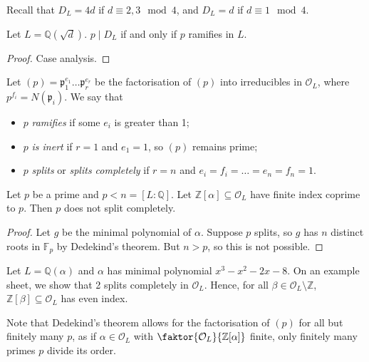 Recall that \( D_L = 4d \) if \( d \equiv 2, 3 \mod 4 \), and \( D_L = d \) if \( d \equiv 1 \mod 4 \).
\begin{corollary}
    Let \( L = \mathbb Q(\sqrt{d}) \).
    \( p \mid D_L \) if and only if \( p \) ramifies in \( L \).
\end{corollary}
\begin{proof}
    Case analysis.
\end{proof}
\begin{definition}
    Let \( (p) = \mathfrak p_1^{e_1} \dots \mathfrak p_r^{e_r} \) be the factorisation of \( (p) \) into irreducibles in \( \mathcal O_L \), where \( p^{f_i} = N(\mathfrak p_i) \).
    We say that
    \begin{itemize}
        \item \( p \) \emph{ramifies} if some \( e_i \) is greater than 1;
        \item \( p \) \emph{is inert} if \( r = 1 \) and \( e_1 = 1 \), so \( (p) \) remains prime;
        \item \( p \) \emph{splits} or \emph{splits completely} if \( r = n \) and \( e_i = f_i = \dots = e_n = f_n = 1 \).
    \end{itemize}
\end{definition}
\begin{corollary}
    Let \( p \) be a prime and \( p < n = [L:\mathbb Q] \).
    Let \( \mathbb Z[\alpha] \subseteq \mathcal O_L \) have finite index coprime to \( p \).
    Then \( p \) does not split completely.
\end{corollary}
\begin{proof}
    Let \( g \) be the minimal polynomial of \( \alpha \).
    Suppose \( p \) splits, so \( g \) has \( n \) distinct roots in \( \mathbb F_p \) by Dedekind's theorem.
    But \( n > p \), so this is not possible.
\end{proof}
\begin{example}
    Let \( L = \mathbb Q(\alpha) \) and \( \alpha \) has minimal polynomial \( x^3 - x^2 - 2x - 8 \).
    On an example sheet, we show that 2 splits completely in \( \mathcal O_L \).
    Hence, for all \( \beta \in \mathcal O_L \setminus \mathbb Z \), \( \mathbb Z[\beta] \subseteq \mathcal O_L \) has even index.
\end{example}
Note that Dedekind's theorem allows for the factorisation of \( (p) \) for all but finitely many \( p \), as if \( \alpha \in \mathcal O_L \) with \( \faktor{\mathcal O_L}{\mathbb Z[\alpha]} \) finite, only finitely many primes \( p \) divide its order.
